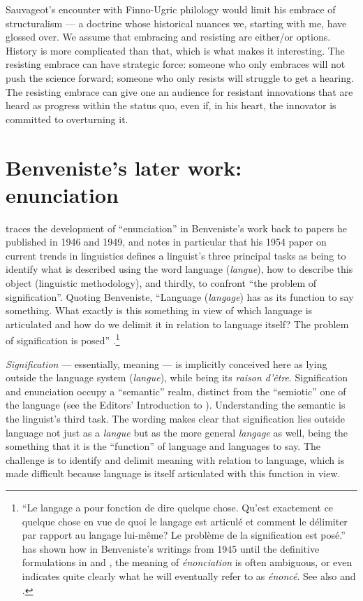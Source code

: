 \documentclass[output=paper]{langscibook}
\begin{document}
Sauvageot's encounter with Finno-Ugric philology would limit his embrace of structuralism — a doctrine whose historical nuances we, starting with me, have glossed over. We assume that embracing and resisting are either/or options. History is more complicated than that, which is what makes it interesting. The resisting embrace can have strategic force: someone who only embraces will not push the science forward; someone who only resists will struggle to get a hearing. The resisting embrace can give one an audience for resistant innovations that are heard as progress within the status quo, even if, in his heart, the innovator is committed to overturning it.

\section{Benveniste’s later work: enunciation}
\label{sec:joseph:laterwork}

\citet{Normand1986} traces the development of ``enunciation'' in Benveniste's work back to papers he published in 1946 and 1949, and notes in particular that his 1954 paper on current trends in linguistics defines a linguist's three principal tasks as being to identify what is described using the word language (\emph{langue}), how to describe this object (linguistic methodology), and thirdly, to confront ``the problem of signification''. Quoting Benveniste, ``Language (\emph{langage}) has as its function to say something. What exactly is this something in view of which language is articulated and how do we delimit it in relation to language itself? The problem of signification is posed'' \citep[7]{Benveniste1954}.\footnote{``Le langage a pour fonction de dire quelque chose. Qu'est exactement ce quelque chose en vue de quoi le langage est articulé et comment le délimiter par rapport au langage lui-même? Le problème de la signification est posé.'' \citet[27--57]{Ono2007} has shown how in Benveniste's writings from 1945 until the definitive formulations in \citeyear{Benveniste1969semiologie} and \citeyear{Benveniste1970appareil}, the meaning of \emph{énonciation} is often ambiguous, or even indicates quite clearly what he will eventually refer to as \emph{énoncé}. See also \citet{Coquet1987} and \citet{JosephInPress}.}

\emph{Signification} — essentially, meaning — is implicitly conceived here as lying outside the language system (\emph{langue}), while being its \emph{raison d’être}. Signification and enunciation occupy a ``semantic'' realm, distinct from the ``semiotic'' one of the language (see the Editors' Introduction to \citet[49-51]{Benveniste2012}). Understanding the semantic is the linguist's third task. The wording makes clear that signification lies outside language not just as a \emph{langue} but as the more general \emph{langage} as well, being the something that it is the ``function'' of language and languages to say. The challenge is to identify and delimit meaning with relation to language, which is made difficult because language is itself articulated with this function in view.
\end{document}
